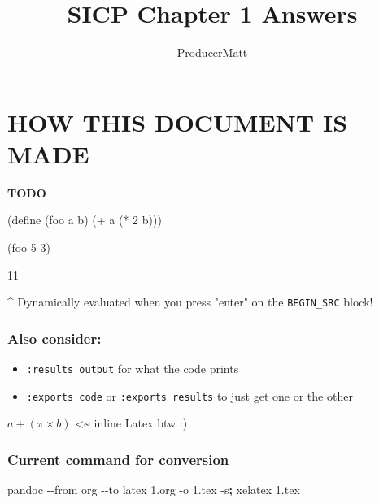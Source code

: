 \documentclass[
]{article}
\title{SICP Chapter 1 Answers}
\author{ProducerMatt}
\date{}
\newenvironment{Shaded}{}{}
\newcommand{\AttributeTok}[1]{\textcolor[rgb]{0.49,0.56,0.16}{#1}}
\newcommand{\DecValTok}[1]{\textcolor[rgb]{0.25,0.63,0.44}{#1}}
\newcommand{\ExtensionTok}[1]{#1}
\newcommand{\FunctionTok}[1]{\textcolor[rgb]{0.02,0.16,0.49}{#1}}
\newcommand{\KeywordTok}[1]{\textcolor[rgb]{0.00,0.44,0.13}{\textbf{#1}}}
\newcommand{\NormalTok}[1]{#1}
\newcommand{\OperatorTok}[1]{\textcolor[rgb]{0.40,0.40,0.40}{#1}}
\providecommand{\tightlist}{%
  \setlength{\itemsep}{0pt}\setlength{\parskip}{0pt}}
\begin{document}
\maketitle

\hypertarget{how-this-document-is-made}{%
\section{HOW THIS DOCUMENT IS MADE}\label{how-this-document-is-made}}

\textbf{\textbf{TODO}}

\hypertarget{testing}{%
\label{testing}}%
\begin{Shaded}
\begin{Highlighting}[numbers=left,,]
\NormalTok{(}\ExtensionTok{define}\FunctionTok{ }\NormalTok{(foo a b)}
\NormalTok{  (}\OperatorTok{+}\NormalTok{ a (}\OperatorTok{*} \DecValTok{2}\NormalTok{ b)))}

\NormalTok{(foo }\DecValTok{5} \DecValTok{3}\NormalTok{)}
\end{Highlighting}
\end{Shaded}

11

\^{} Dynamically evaluated when you press "enter" on the
\texttt{BEGIN\_SRC} block!

\hypertarget{also-consider}{%
\subsubsection{Also consider:}\label{also-consider}}

\begin{itemize}
\tightlist
\item
  \texttt{:results\ output} for what the code prints
\item
  \texttt{:exports\ code} or \texttt{:exports\ results} to just get one
  or the other
\end{itemize}

\(a + (\pi \times b)\) \textless\textasciitilde{} inline Latex btw :)

\hypertarget{current-command-for-conversion}{%
\subsubsection{Current command for
conversion}\label{current-command-for-conversion}}

\begin{Shaded}
\begin{Highlighting}[]
\ExtensionTok{pandoc} \AttributeTok{{-}{-}from}\NormalTok{ org }\AttributeTok{{-}{-}to}\NormalTok{ latex 1.org }\AttributeTok{{-}o}\NormalTok{ 1.tex }\AttributeTok{{-}s}\KeywordTok{;} \ExtensionTok{xelatex}\NormalTok{ 1.tex}
\end{Highlighting}
\end{Shaded}
\end{document}
